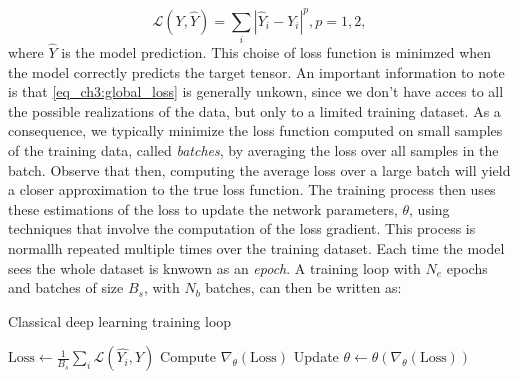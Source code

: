 \begin{equation}\label{eq:euclidean norm}
    \mathcal{L}(Y,\hat{Y})=\sum_i |\hat{Y}_i-Y_i|^p, p=1,2,
\end{equation}
where $\hat{Y}$ is the model prediction. This choise of loss function is minimzed when the model correctly predicts the target tensor.
An important information to note is that \cref{eq_ch3:global_loss} is generally unkown, since we don't have acces to all the possible realizations of the data, but only to a limited training dataset. As a consequence, we typically minimize the loss function computed on small samples of the training data, called \emph{batches}, by averaging the loss over all samples in the batch. Observe that then, computing the average loss over a large batch will yield a closer approximation to the true loss function. The training process then uses these estimations of the loss to update the network parameters, $\theta$, using techniques that involve the computation of the loss gradient. This process is normallh repeated multiple times over the training dataset. Each time the model sees the whole dataset is knwown as an \emph{epoch}. A training loop with $N_e$ epochs and batches of size $B_s$, with $N_b$ batches, can then be written as:

\begin{algorithm}
    \caption{Classical deep learning training loop}\label{alg:training loop}
    \begin{algorithmic}
        \State $\text{Loss}\gets \frac{1}{B_s}\sum_i\mathcal{L}(\hat{Y_i},Y) $
        \State Compute $\nabla_\theta (\text{Loss})$
        \State Update $\theta \gets \theta(\nabla_\theta (\text{Loss}))$
        \EndWhile    
    \EndWhile
    \end{algorithmic}
    \end{algorithm}

